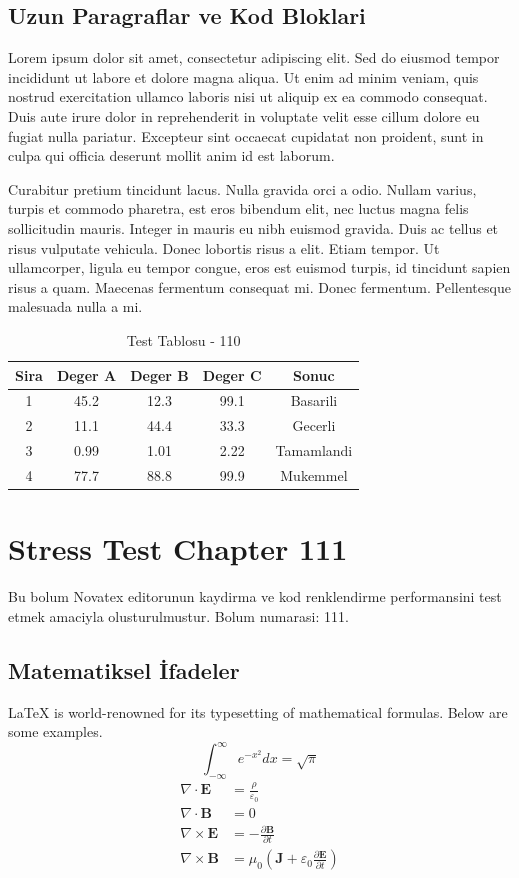 \documentclass[12pt,a4paper]{article}
\begin{document}
\subsection{Uzun Paragraflar ve Kod Bloklari}
Lorem ipsum dolor sit amet, consectetur adipiscing elit. Sed do eiusmod tempor incididunt ut labore et dolore magna aliqua. Ut enim ad minim veniam, quis nostrud exercitation ullamco laboris nisi ut aliquip ex ea commodo consequat. Duis aute irure dolor in reprehenderit in voluptate velit esse cillum dolore eu fugiat nulla pariatur. Excepteur sint occaecat cupidatat non proident, sunt in culpa qui officia deserunt mollit anim id est laborum.

Curabitur pretium tincidunt lacus. Nulla gravida orci a odio. Nullam varius, turpis et commodo pharetra, est eros bibendum elit, nec luctus magna felis sollicitudin mauris. Integer in mauris eu nibh euismod gravida. Duis ac tellus et risus vulputate vehicula. Donec lobortis risus a elit. Etiam tempor. Ut ullamcorper, ligula eu tempor congue, eros est euismod turpis, id tincidunt sapien risus a quam. Maecenas fermentum consequat mi. Donec fermentum. Pellentesque malesuada nulla a mi.

\begin{table}[h!]
\centering
\begin{tabular}{|c|c|c|c|c|}
\hline
\textbf{Sira} & \textbf{Deger A} & \textbf{Deger B} & \textbf{Deger C} & \textbf{Sonuc} \\
\hline
1 & 45.2 & 12.3 & 99.1 & Basarili \\
2 & 11.1 & 44.4 & 33.3 & Gecerli \\
3 & 0.99 & 1.01 & 2.22 & Tamamlandi \\
4 & 77.7 & 88.8 & 99.9 & Mukemmel \\
\hline
\end{tabular}
\caption{Test Tablosu - 110}
\end{table}

\newpage
\section{Stress Test Chapter 111}
Bu bolum Novatex editorunun kaydirma ve kod renklendirme performansini test etmek amaciyla olusturulmustur. Bolum numarasi: 111.

\subsection{Matematiksel İfadeler}
\LaTeX{} is world-renowned for its typesetting of mathematical formulas. Below are some examples.
\begin{equation}
\int_{-\infty}^{\infty} e^{-x^2} dx = \sqrt{\pi}
\end{equation}
\begin{align}
\nabla \cdot \mathbf{E} &= \frac{\rho}{\varepsilon_0} \\
\nabla \cdot \mathbf{B} &= 0 \\
\nabla \times \mathbf{E} &= -\frac{\partial \mathbf{B}}{\partial t} \\
\nabla \times \mathbf{B} &= \mu_0\left(\mathbf{J} + \varepsilon_0 \frac{\partial \mathbf{E}}{\partial t}\right)
\end{align}
\end{document}
